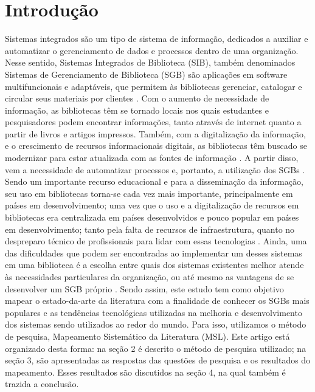 \documentclass[12pt]{article}
\begin{document}
\section{Introdução}
Sistemas integrados são um tipo de sistema de informação, dedicados a auxiliar e automatizar o gerenciamento de dados e processos dentro de uma organização. Nesse sentido, Sistemas Integrados de Biblioteca (SIB), também denominados Sistemas de Gerenciamento de Biblioteca (SGB) são aplicações em software multifuncionais e adaptáveis, que permitem às bibliotecas gerenciar, catalogar e circular seus materiais por clientes \cite{Muller:2011}. Com o aumento de necessidade de informação, as bibliotecas têm se tornado locais nos quais estudantes e pesquisadores podem encontrar informações, tanto através de internet quanto a partir de livros e artigos impressos. Também, com a digitalização da informação, e o crescimento de recursos informacionais digitais, as bibliotecas têm buscado se modernizar para estar atualizada com as fontes de informação \cite{Thanuskodi:2011}. \newline
A partir disso, vem a necessidade de automatizar processos e, portanto, a utilização dos SGBs \cite{aina2008information}. Sendo um importante recurso educacional e para a disseminação da informação, seu uso em bibliotecas torna-se cada vez mais importante, principalmente em países em desenvolvimento; uma vez que o uso e a digitalização de recursos em bibliotecas era centralizada em países desenvolvidos e pouco popular em países em desenvolvimento; tanto pela falta de recursos de infraestrutura, quanto no despreparo técnico de profissionais para lidar com essas tecnologias \cite{aina2008information}. Ainda, uma das dificuldades que podem ser encontradas ao implementar um desses sistemas em uma biblioteca é a escolha entre quais dos sistemas existentes melhor atende às necessidades particulares da organização, ou até mesmo as vantagens de se desenvolver um SGB próprio \cite{JILA52}. \newline
Sendo assim, este estudo tem como objetivo mapear o estado-da-arte da literatura com a finalidade de conhecer os SGBs mais populares e as tendências tecnológicas utilizadas na melhoria e desenvolvimento dos sistemas sendo utilizados ao redor do mundo. Para isso, utilizamos o método de pesquisa, Mapeamento Sistemático da Literatura (MSL). 
Este artigo está organizado desta forma: na seção 2 é descrito o método de pesquisa utilizado; na seção 3, são apresentadas as respostas das questões de pesquisa e os resultados do mapeamento. Esses resultados são discutidos na seção 4, na qual também é trazida a conclusão.
\end{document}
